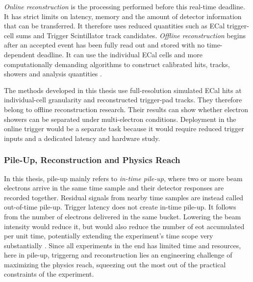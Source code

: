 \emph{Online reconstruction} is the processing performed before this
real-time deadline. It has strict limits on latency, memory and the amount of detector
information that can be transferred. It therefore uses reduced quantities
such as ECal trigger-cell sums and Trigger Scintillator track candidates.
\emph{Offline reconstruction} begins after an accepted event has been fully
read out and stored with no time-dependent deadline. It can use the individual ECal cells and more
computationally demanding algorithms to construct calibrated hits, tracks,
showers and analysis quantities \cite{ldmx2025-overview}.

The methods developed in this thesis use full-resolution simulated ECal hits
at individual-cell granularity and reconstructed trigger-pad tracks. They
therefore belong to offline reconstruction research. Their results can show
whether electron showers can be separated under multi-electron conditions.
Deployment in the online trigger would be a separate task because it would
require reduced trigger inputs and a dedicated latency and hardware study.

\subsubsection{Pile-Up, Reconstruction and Physics Reach}
\label{sec:formalism}

In this thesis, \gls{pile-up} mainly refers to \emph{in-time pile-up}, where
two or more beam electrons arrive in the same time sample and their detector
responses are recorded together. Residual signals from nearby time samples
are instead called out-of-time pile-up. Trigger latency does not create
in-time pile-up. It follows from the number of electrons delivered in the
same bucket. Lowering the beam intensity would reduce it, but would also
reduce the number of \gls{eot} accumulated per unit time, potentially extending the experiment's time scope very substantially
\cite{ldmx2025-overview}. Since all experiments in the end has limited time and resources, here in pile-up, triggerng and reconstruction lies an engineering challenge of maximizing the physics reach, squeezing out the most out of the practical constraints of the experiment.

